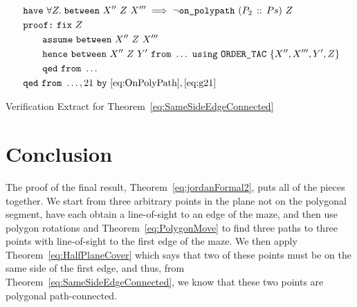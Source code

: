 \begin{boxedfigure}
\begin{align*}
  &\code{have}\ \forall Z.\; \between{X''}{Z}{X'''} \implies \neg\code{on\_polypath}\ (\cons{P_2}{Ps})\ Z\\\
  &\code{proof:}\ \code{fix}\ Z\\
  &\qquad \code{assume}\ \between{X''}{Z}{X'''}\\
  &\qquad \code{hence}\ \between{X''}{Z}{Y'}\ \code{from}\ \ldots\ \code{using}\ \code{ORDER\_TAC}\ \{X'',X''',Y',Z\}\\
  &\qquad \code{qed}\ \code{from}\ \ldots\\
  &\code{qed}\ \code{from}\ \ldots,21\ \code{by}\ \eqref{eq:OnPolyPath},\eqref{eq:g21}
\end{align*}
\caption{Verification Extract for Theorem~\ref{eq:SameSideEdgeConnected}}
\label{fig:SameSideEdgeConnectedExtract}
\end{boxedfigure}

\section{Conclusion}
The proof of the final result, Theorem~\ref{eq:jordanFormal2}, puts all of the pieces together. We start from three arbitrary points in the plane not on the polygonal segment, have each obtain a line-of-sight to an edge of the maze, and then use polygon rotations and Theorem~\ref{eq:PolygonMove} to find three paths to three points with line-of-sight to the first edge of the maze. We then apply  Theorem~\ref{eq:HalfPlaneCover} which says that two of these points must be on the same side of the first edge, and thus, from Theorem~\ref{eq:SameSideEdgeConnected}, we know that these two points are polygonal path-connected.

